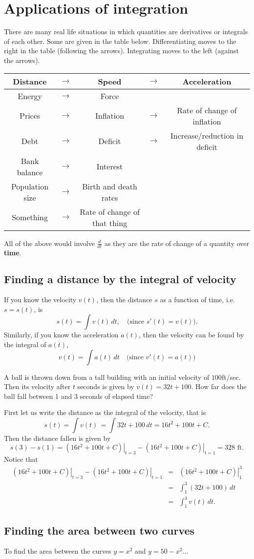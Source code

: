 \section{Applications of integration}

There are many real life situations in which quantities are derivatives or integrals of each other. Some are given in the table below.
Differentiating moves to the right in the table (following the arrows). Integrating moves to the left (against the arrows).

\begin{tabular}{|ccccc|}
\hline
Distance &$\rightarrow$& Speed &$\rightarrow$& Acceleration\\\hline
Energy &$\rightarrow$& Force&&\\\hline
Prices &$\rightarrow$& Inflation &$\rightarrow$& Rate of change of inflation\\\hline
Debt &$\rightarrow$& Deficit &$\rightarrow$& Increase/reduction in deficit\\\hline
Bank balance &$\rightarrow$& Interest &&\\\hline
Population size &$\rightarrow$& Birth and death rates&&\\\hline
\hline
Something &$\rightarrow$& Rate of change of that thing &&\\\hline
\end{tabular}

All of the above would involve $\frac{d}{dt}$ as they are the rate of change of a quantity over \textbf{time}.

\subsection{Finding a distance by the integral of velocity}
If you know the velocity $v(t)$, then the distance $s$ as a function of time, i.e. $s=s(t)$, is
\[s(t)=\int v(t)\,dt,\quad \text{(since }s'(t)=v(t)\text{)}.\]
Similarly, if you know the acceleration $a(t)$, then the velocity can be found by the integral of $a(t)$,
\[v(t)=\int a(t)\,dt \quad \text{(since }v'(t)=a(t)\text{)}\]

\begin{example}
A ball is thrown down from a tall building with an initial velocity of $100$ft/sec. Then its velocity after $t$ seconds is given by $v(t)=32t+100$. How far does the ball fall between 1 and 3 seconds of elapsed time?

First let us write the distance as the integral of the velocity, that is
\[s(t)=\int v(t)\,=\int 32t+100\,dt = 16t^2+100t+C.\]
Then the distance fallen is given by
\[s(3)-s(1)=\left.(16t^2+100t+C)\right|_{t=3} - \left.(16t^2+100t+C)\right|_{t=1}=328 \text{ ft.}\]
Notice that
\begin{eqnarray*}
\left.(16t^2+100t+C)\right|_{t=3} - \left.(16t^2+100t+C)\right|_{t=1} &=& \left.(16t^2+100t+C)\right|_1^3 \\
&=& \int_1^3 (32t+100)\,dt \\
&=& \int_1^3 v(t)\,dt.
\end{eqnarray*}
\end{example}


\subsection{Finding the area between two curves}
\begin{example}
To find the area between the curves $y=x^2$ and $y=50-x^2$...
\end{example}
